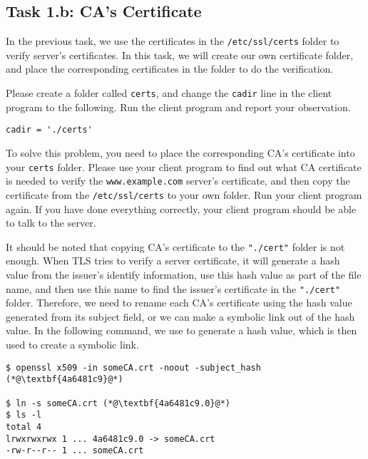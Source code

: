 \subsection{Task 1.b: CA's Certificate}

In the previous task, we use the certificates in
the \texttt{/etc/ssl/certs} folder to verify server's certificates. In this task,
we will create our own certificate folder, and place the corresponding 
certificates in the folder to do the verification.


Please create a folder called \texttt{certs}, and change the 
\texttt{cadir} line in the client program to the following. Run the client program
and report your observation.

\begin{lstlisting}
cadir = './certs'   
\end{lstlisting}


To solve this problem, you need to place the corresponding CA's certificate 
into your \texttt{certs} folder.  Please use your client program
to find out what CA certificate is needed to verify
the \texttt{www.example.com} server's certificate, and then copy
the certificate from the \texttt{/etc/ssl/certs} to your 
own folder. Run your client program again. If you have done everything correctly,
your client program should be able to talk to the server.


It should be noted that copying CA's certificate to the \texttt{"./cert"} folder is
not enough.  When
TLS tries to verify a server certificate, it will generate a hash value from the
issuer's identify information, use this hash value as part of the file name, and
then use this name to find the issuer's certificate in the \texttt{"./cert"} folder.
Therefore, we need to rename each CA's certificate using the hash value generated from its
subject field, or we can make a symbolic link out of the hash value. In the following command,
we use \openssl to generate a hash value, which is then used to create a symbolic link.

\begin{lstlisting}
$ openssl x509 -in someCA.crt -noout -subject_hash
(*@\textbf{4a6481c9}@*)

$ ln -s someCA.crt (*@\textbf{4a6481c9.0}@*)
$ ls -l
total 4
lrwxrwxrwx 1 ... 4a6481c9.0 -> someCA.crt
-rw-r--r-- 1 ... someCA.crt
\end{lstlisting}


